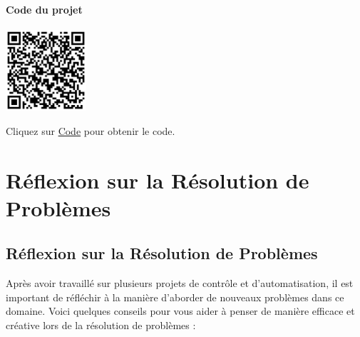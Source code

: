 \documentclass[a4paper,12pt]{report}
\begin{document}
\subsubsection{Code du projet}

\begin{minipage}{0.5\textwidth}
    \includegraphics[height=3cm]{Code TC311.png}
\end{minipage}%
\begin{minipage}{0.5\textwidth}
    Cliquez sur \href{https://github.com/DexterTaha/Controllino-PLC-Sample/blob/main/TC300/TC311_Ligne_d'assemblage_Bero/TC311_Ligne_d'assemblage_Bero.ino}{Code} pour obtenir le code.
\end{minipage}



\chapter{\textbf{Réflexion sur la Résolution de Problèmes }}
\section*{Réflexion sur la Résolution de Problèmes}

Après avoir travaillé sur plusieurs projets de contrôle et d'automatisation, il est important de réfléchir à la manière d'aborder de nouveaux problèmes dans ce domaine. Voici quelques conseils pour vous aider à penser de manière efficace et créative lors de la résolution de problèmes :
\end{document}
